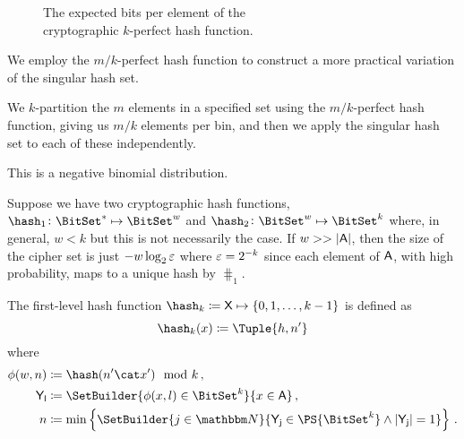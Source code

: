 \documentclass[ ../main.tex]{subfiles}
\begin{document}
\begin{figure}
\centering
\caption{The expected bits per element of the\\cryptographic $k$-perfect hash function.}
\end{figure}


We employ the $m/k$-perfect hash function to construct a more practical variation of the singular hash set.

We $k$-partition the $m$ elements in a specified set using the $m/k$-perfect hash function, giving us $m/k$ elements per bin, and then we apply the singular hash set to each of these independently.

This is a negative binomial distribution.


Suppose we have two cryptographic hash functions, $\hash_1 \colon \BitSet^* \mapsto \BitSet^w$ and $\hash_2 \colon \BitSet^w \mapsto \BitSet^k$ where, in general, $w < k$ but this is not necessarily the case.
If $w >> \Card{\Set{A}}$, then the size of the cipher set is just $-w \log_2 \varepsilon$ where $\varepsilon = 2^{-k}$ since each element of $\Set{A}$, with high probability, maps to a unique hash by $\hash_1$.




The first-level hash function $\hash_k \coloneqq \Set{X} \mapsto \{0,1,\ldots,k-1\}$ is defined as
\begin{equation}
	\hash_{k}(x) \coloneqq \Tuple{h,n'}
\end{equation}
where
\begin{equation}
\begin{split}
	\phi(w,n) 	& \coloneqq \hash(n' \cat x') \mod k\,,\\
	\Set{Y}[l] 	& \coloneqq \SetBuilder{\phi(x,l) \in \BitSet^k}{x \in \Set{A}}\,,\\
	n 			& \coloneqq \min\left\{\SetBuilder{ j \in \NatSet }{ \Set{Y}[j] \in \PS{\BitSet^k} \land \Card{\Set{Y}[j]} = 1}\right\}\,.
\end{split}
\end{equation}
\end{document}
